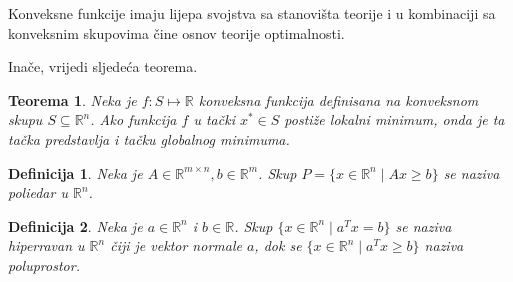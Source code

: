 \documentclass[a4paper, utf8, 11pt, colorlinks]{book}
\newtheorem{definition}{Definicija}
\newtheorem{thm}{Teorema}
\newenvironment{proof}{{Dokaz:}}{\hfill$\square$}
\begin{document}
Konveksne funkcije imaju lijepa svojstva sa stanovišta teorije i u kombinaciji sa konveksnim skupovima čine osnov  teorije optimalnosti. 

Inače, vrijedi sljedeća teorema.
\begin{thm}
  Neka je $f : S \mapsto \mathbb{R}$ konveksna funkcija definisana na konveksnom skupu $S \subseteq \mathbb{R}^n$. Ako funkcija $f$ u tački $x^* \in S$
 postiže lokalni minimum, onda je ta tačka predstavlja i tačku globalnog minimuma.
\end{thm}

\begin{definition}
   Neka je $A \in \mathbb{R}^{m \times n}, b \in \mathbb{R}^m$. Skup $P=\{x \in \mathbb{R}^n \mid Ax \geq b\}$ se naziva poliedar u $\mathbb{R}^n$. 
\end{definition}
\begin{definition}
   Neka je $a\in \mathbb{R}^n $ i $b \in \mathbb{R}$. Skup $\{ x \in \mathbb{R}^n \mid a^T x = b \}$ se naziva hiperravan u $\mathbb{R}^n$ čiji je vektor  normale $a$, dok se $\{ x \in \mathbb{R}^n \mid a^T x \geq b \}$ naziva poluprostor. 
\end{definition}
\end{document}
